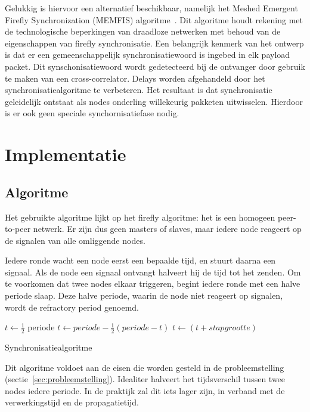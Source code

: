\documentclass[a4paper,10pt]{article}
\begin{document}
Gelukkig is hiervoor een alternatief beschikbaar, namelijk het Meshed Emergent Firefly Synchronization (MEMFIS) algoritme~\cite{tyrrell2010emergent}. Dit algoritme houdt rekening met de technologische beperkingen van draadloze netwerken met behoud van de eigenschappen van firefly synchronisatie. Een belangrijk kenmerk van het ontwerp is dat er een gemeenschappelijk synchronisatiewoord is ingebed in elk payload packet. Dit synschonisatiewoord wordt gedetecteerd bij de ontvanger door gebruik te maken van een cross-correlator. Delays worden afgehandeld door het synchronisatiealgoritme te verbeteren. Het resultaat is dat synchronisatie geleidelijk ontstaat als nodes onderling willekeurig pakketen uitwisselen. Hierdoor is er ook geen speciale synchornisatiefase nodig.

\section{Implementatie}
\subsection{Algoritme}\label{sec:alg}
Het gebruikte algoritme lijkt op het firefly algoritme: het is een homogeen peer-to-peer netwerk. Er zijn dus geen masters of slaves, maar iedere node reageert op de signalen van alle omliggende nodes. 

Iedere ronde wacht een node eerst een bepaalde tijd, en stuurt daarna een signaal. Als de node een signaal ontvangt halveert hij de tijd tot het zenden. Om te voorkomen dat twee nodes elkaar triggeren, begint iedere ronde met een halve periode slaap. Deze halve periode, waarin de node niet reageert op signalen, wordt de refractory period genoemd.

\begin{algorithm}
    \begin{algorithmic}
    \Loop
            \State {}
            \State {}
            \State $t \gets \frac{1}{2}$ periode
        \EndIf
            \State $t \gets periode - \frac{1}{2} (periode - t)$
        \Else
            \State {}
            \State $t \gets (t + stapgrootte)$
        \EndIf
    \EndLoop
    \end{algorithmic}
    \caption{Synchronisatiealgoritme}
\end{algorithm}

Dit algoritme voldoet aan de eisen die worden gesteld in de probleemstelling (sectie~\ref{sec:probleemstelling}). Idealiter halveert het tijdsverschil tussen twee nodes iedere periode. In de praktijk zal dit iets lager zijn, in verband met de verwerkingstijd en de propagatietijd.
\end{document}
